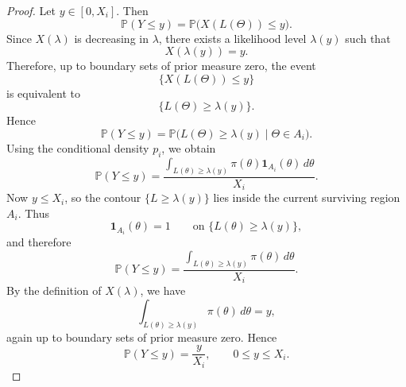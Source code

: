 \documentclass[11pt, titlepage]{article} %
\numberwithin{equation}{section}
\theoremstyle{definition}
\numberwithin{assumption}{section}
\begin{document}
\begin{proof}
    Let $y\in[0,X_i]$. Then
\begin{equation*}
\mathbb{P}(Y\le y)
=
\mathbb{P}\bigl(X(L(\Theta))\le y\bigr).
\end{equation*}
Since $X(\lambda)$ is decreasing in $\lambda$, there exists a likelihood level
$\lambda(y)$ such that
\begin{equation*}
X(\lambda(y))=y.
\end{equation*}
Therefore, up to boundary sets of prior measure zero, the event
\begin{equation*}
\{X(L(\Theta))\le y\}
\end{equation*}
is equivalent to
\begin{equation*}
\{L(\Theta)\ge \lambda(y)\}.
\end{equation*}
Hence
\begin{equation*}
\mathbb{P}(Y\le y)
=
\mathbb{P}\bigl(L(\Theta)\ge \lambda(y)\mid \Theta\in A_i\bigr).
\end{equation*}
Using the conditional density $p_i$, we obtain
\begin{equation*}
\mathbb{P}(Y\le y)
=
\frac{\displaystyle \int_{L(\theta)\ge \lambda(y)}
\pi(\theta)\mathbf{1}_{A_i}(\theta)\,d\theta}{X_i}.
\end{equation*}
Now $y\le X_i$, so the contour $\{L\ge \lambda(y)\}$ lies inside the current
surviving region $A_i$. Thus
\begin{equation*}
\mathbf{1}_{A_i}(\theta)=1
\qquad\text{on }\{L(\theta)\ge \lambda(y)\},
\end{equation*}
and therefore
\begin{equation*}
\mathbb{P}(Y\le y)
=
\frac{\displaystyle \int_{L(\theta)\ge \lambda(y)} \pi(\theta)\,d\theta}{X_i}.
\end{equation*}
By the definition of $X(\lambda)$, we have
\begin{equation*}
\int_{L(\theta)\ge \lambda(y)} \pi(\theta)\,d\theta = y,
\end{equation*}
again up to boundary sets of prior measure zero. Hence
\begin{equation*}
\mathbb{P}(Y\le y)=\frac{y}{X_i},
\qquad 0\le y\le X_i.
\end{equation*}
\end{proof}
\end{document}
